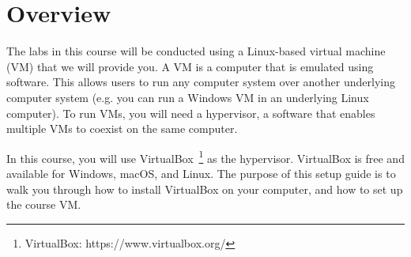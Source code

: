 \documentclass[11pt]{article}
\begin{document}
\maketitle \thispagestyle{fancy}



\section{Overview}
\label{sec:overview}
The labs in this course will be conducted using a Linux-based virtual machine (VM) that we will provide you. A VM is a computer that is emulated using software. This allows users to run any computer system over another underlying computer system (e.g. you can run a Windows VM in an underlying Linux computer). To run VMs, you will need a hypervisor, a software that enables multiple VMs to coexist on the same computer.

In this course, you will use VirtualBox~\footnote{VirtualBox: https://www.virtualbox.org/} as the hypervisor. VirtualBox is free and available for Windows, macOS, and Linux. The purpose of this setup guide is to walk you through how to install VirtualBox on your computer, and how to set up the course VM.





\end{document}

